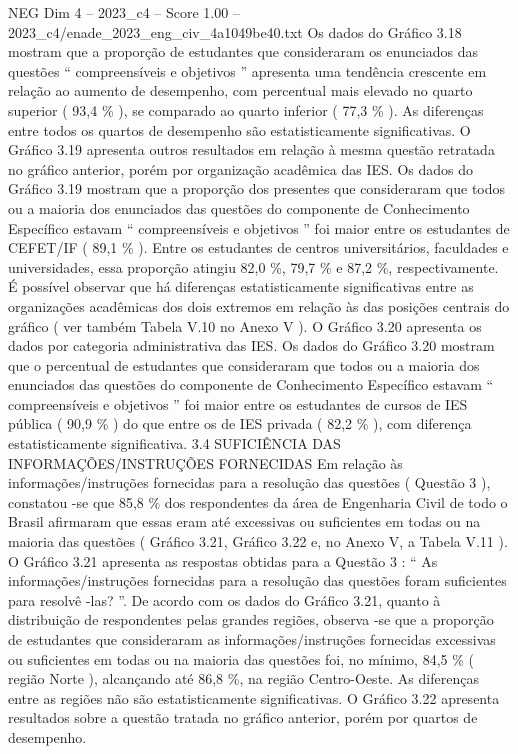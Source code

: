 \begin{textsample}{NEG Dim 4 – 2023\_c4 – Score 1.00 – 2023\_c4/enade\_2023\_eng\_civ\_4a1049be40.txt}
Os dados do Gráfico 3.18 mostram que a proporção de estudantes que consideraram os enunciados das questões “ compreensíveis e objetivos ” apresenta uma tendência crescente em relação ao aumento de desempenho, com percentual mais elevado no quarto superior ( 93,4 \% ), se comparado ao quarto inferior ( 77,3 \% ).
As diferenças entre todos os quartos de desempenho são estatisticamente significativas.
O Gráfico 3.19 apresenta outros resultados em relação à mesma questão retratada no gráfico anterior, porém por organização acadêmica das IES.
Os dados do Gráfico 3.19 mostram que a proporção dos presentes que consideraram que todos ou a maioria dos enunciados das questões do componente de Conhecimento Específico estavam “ compreensíveis e objetivos ” foi maior entre os estudantes de CEFET/IF ( 89,1 \% ).
Entre os estudantes de centros universitários, faculdades e universidades, essa proporção atingiu 82,0 \%, 79,7 \% e 87,2 \%, respectivamente.
É possível observar que há diferenças estatisticamente significativas entre as organizações acadêmicas dos dois extremos em relação às das posições centrais do gráfico ( ver também Tabela V.10 no Anexo V ).
O Gráfico 3.20 apresenta os dados por categoria administrativa das IES.
Os dados do Gráfico 3.20 mostram que o percentual de estudantes que consideraram que todos ou a maioria dos enunciados das questões do componente de Conhecimento Específico estavam “ compreensíveis e objetivos ” foi maior entre os estudantes de cursos de IES pública ( 90,9 \% ) do que entre os de IES privada ( 82,2 \% ), com diferença estatisticamente significativa. 3.4 SUFICIÊNCIA DAS INFORMAÇÕES/INSTRUÇÕES FORNECIDAS Em relação às informações/instruções fornecidas para a resolução das questões ( Questão 3 ), constatou -se que 85,8 \% dos respondentes da área de Engenharia Civil de todo o Brasil afirmaram que essas eram até excessivas ou suficientes em todas ou na maioria das questões ( Gráfico 3.21, Gráfico 3.22 e, no Anexo V, a Tabela V.11 ).
O Gráfico 3.21 apresenta as respostas obtidas para a Questão 3 : “ As informações/instruções fornecidas para a resolução das questões foram suficientes para resolvê -las? ”.
De acordo com os dados do Gráfico 3.21, quanto à distribuição de respondentes pelas grandes regiões, observa -se que a proporção de estudantes que consideraram as informações/instruções fornecidas excessivas ou suficientes em todas ou na maioria das questões foi, no mínimo, 84,5 \% ( região Norte ), alcançando até 86,8 \%, na região Centro-Oeste.
As diferenças entre as regiões não são estatisticamente significativas.
O Gráfico 3.22 apresenta resultados sobre a questão tratada no gráfico anterior, porém por quartos de desempenho.

\end{textsample}
